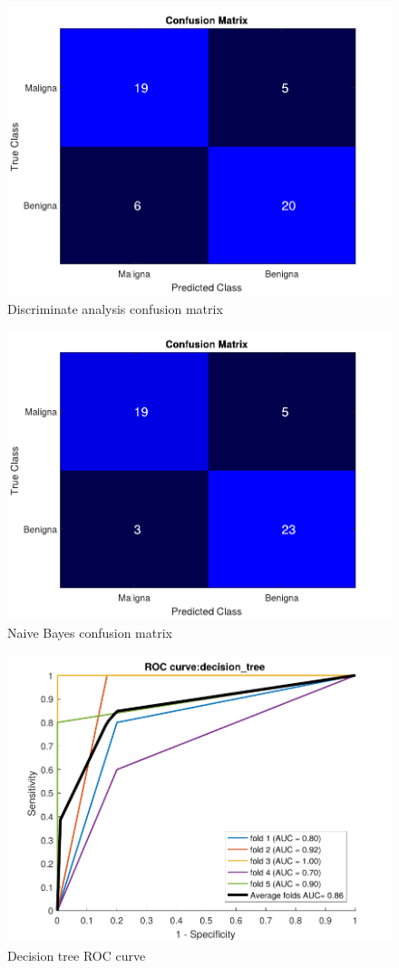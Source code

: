 \documentclass[conference]{IEEEtran}
\begin{document}
		\begin{figure}[ht]
			\centering
			\includegraphics[width=0.7\linewidth]{images/results/discrim_analysisConfusion}
			\caption{Discriminate analysis confusion matrix}
			\label{fig:discrimanalysisconfusion}
		\end{figure}
	
		\begin{figure}[ht]
			\centering
			\includegraphics[width=0.7\linewidth]{images/results/naive_bayesConfusion}
			\caption{Naive Bayes confusion matrix}
			\label{fig:naivebayesconfusion}
		\end{figure}
	
		\begin{figure}[!htp]
			\centering
			\includegraphics[width=0.7\linewidth]{images/results/decision_treeROC}
			\caption{Decision tree ROC curve}
			\label{fig:decisiontreeroc}
		\end{figure}
		
\end{document}
